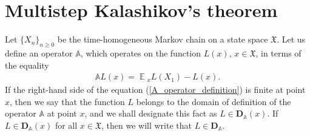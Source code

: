\documentclass[10pt, reqno]{amsart}
\theoremstyle{definition}
\newcommand{\atoVar}{\mathbb{A}} %
\newcommand{\ltfVar}{L} %
\newcommand{\assVar}{\mathfrak{X}} %
\newcommand{\akdVar}{\mathbf{D}_{\atoVar}} %
\DeclareMathOperator*{\E}{\mathbb{E}}
\begin{document}
	
	\section{Multistep Kalashikov's theorem}
	Let $\{X_{n}\}_{n \geq 0}$ be the time-homogeneous Markov chain on a state space $\assVar$. Let us define an operator $\atoVar$, which operates on the function $\ltfVar(x)$, $x \in \assVar$, in terms of the equality
	\begin{gather}
		\atoVar\ltfVar(x) = \E{}_{x}\ltfVar(X_{1}) - \ltfVar(x).
		\label{A_operator_definition}
	\end{gather}
	If the right-hand side of the equation (\ref{A_operator_definition}) is finite at point $x$, then we say that the function $\ltfVar$ belongs to the domain of definition of the operator $\atoVar$ at point $x$, and we shall designate this fact as $\ltfVar \in \akdVar(x)$. If $\ltfVar \in \akdVar(x)$ for all $x \in \assVar$, then we will write that $\ltfVar \in \akdVar$.
	
\end{document}

